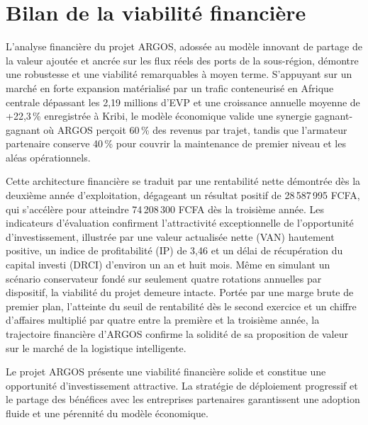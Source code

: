 \section{Bilan de la viabilité financière}

L’analyse financière du projet ARGOS, adossée au modèle innovant de partage de la valeur ajoutée et ancrée sur les flux réels des ports de la sous-région, démontre une robustesse et une viabilité remarquables à moyen terme. S'appuyant sur un marché en forte expansion matérialisé par un trafic conteneurisé en Afrique centrale dépassant les 2,19 millions d'EVP et une croissance annuelle moyenne de +22,3\,\% enregistrée à Kribi, le modèle économique valide une synergie gagnant-gagnant où ARGOS perçoit 60\,\% des revenus par trajet, tandis que l’armateur partenaire conserve 40\,\% pour couvrir la maintenance de premier niveau et les aléas opérationnels. 

Cette architecture financière se traduit par une rentabilité nette démontrée dès la deuxième année d'exploitation, dégageant un résultat positif de 28\,587\,995 FCFA, qui s'accélère pour atteindre 74\,208\,300 FCFA dès la troisième année. Les indicateurs d'évaluation confirment l'attractivité exceptionnelle de l'opportunité d'investissement, illustrée par une valeur actualisée nette (VAN) hautement positive, un indice de profitabilité (IP) de 3,46 et un délai de récupération du capital investi (DRCI) d'environ un an et huit mois. Même en simulant un scénario conservateur fondé sur seulement quatre rotations annuelles par dispositif, la viabilité du projet demeure intacte. Portée par une marge brute de premier plan, l'atteinte du seuil de rentabilité dès le second exercice et un chiffre d'affaires multiplié par quatre entre la première et la troisième année, la trajectoire financière d'ARGOS confirme la solidité de sa proposition de valeur sur le marché de la logistique intelligente.


\indent Le projet ARGOS présente une viabilité financière solide et constitue une opportunité d’investissement attractive. La stratégie de déploiement progressif et le partage des bénéfices avec les entreprises partenaires garantissent une adoption fluide et une pérennité du modèle économique.
